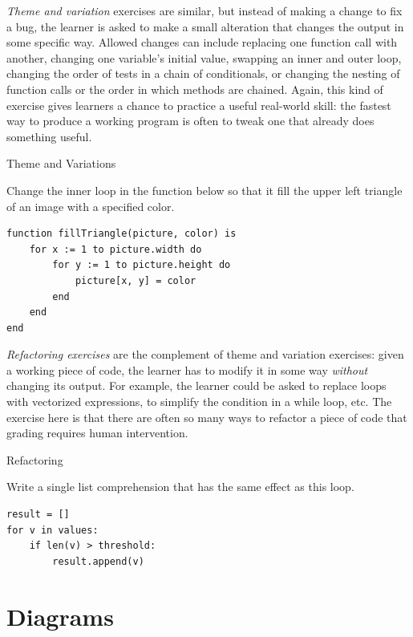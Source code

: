 \emph{Theme and variation} exercises are similar, but instead of
making a change to fix a bug, the learner is asked to make a small
alteration that changes the output in some specific way.  Allowed
changes can include replacing one function call with another, changing
one variable's initial value, swapping an inner and outer loop,
changing the order of tests in a chain of conditionals, or changing
the nesting of function calls or the order in which methods are
chained.  Again, this kind of exercise gives learners a chance to
practice a useful real-world skill: the fastest way to produce a
working program is often to tweak one that already does something
useful.

\begin{callout}{Theme and Variations}

  Change the inner loop in the function below so that it fill the
  upper left triangle of an image with a specified color.

\begin{verbatim}
function fillTriangle(picture, color) is
    for x := 1 to picture.width do
        for y := 1 to picture.height do
            picture[x, y] = color
        end
    end
end
\end{verbatim}

\end{callout}

\emph{Refactoring exercises} are the complement of theme and variation
exercises: given a working piece of code, the learner has to modify it
in some way \emph{without} changing its output. For example, the
learner could be asked to replace loops with vectorized expressions,
to simplify the condition in a while loop, etc. The exercise here is
that there are often so many ways to refactor a piece of code that
grading requires human intervention.

\begin{callout}{Refactoring}

  Write a single list comprehension that has the same effect as this
  loop.

\begin{verbatim}
result = []
for v in values:
    if len(v) > threshold:
        result.append(v)
\end{verbatim}

\end{callout}

\section{Diagrams}\label{s:exercises-diagrams}

